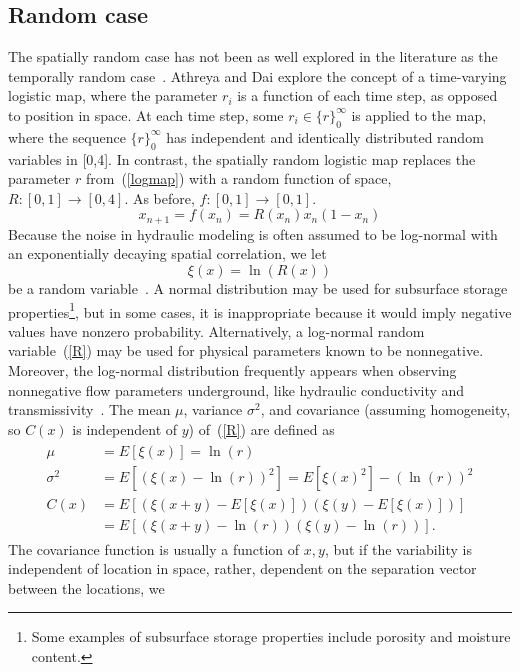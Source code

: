 \subsection{Random case}
The spatially random case has not been as well explored in the
literature as the temporally random case~\cite{athreya}. Athreya and
Dai explore the concept of a time-varying logistic map, where the
parameter $r_i$ is a function of each time step, as opposed to position
in space. At each time step, some $r_i \in \{r\}_0^\infty$ is applied
to the map, where the
sequence $\{r\}_0^\infty$ has independent and identically distributed
random variables in [0,4]. In contrast, the spatially random logistic map replaces the parameter $r$ from~(\ref{logmap}) with a random function of space, $R:[0,1]\to [0,4]$. As before,
$f:[0,1]\to [0,1]$.
\begin{equation}\label{randlogmap}
x_{n+1} = f(x_n) = R(x_n)x_n(1-x_n)
\end{equation}
Because the noise in hydraulic modeling is often assumed to be log-normal with an
exponentially decaying spatial correlation, we let
\begin{equation}\label{R}
\xi(x)=\ln(R(x)) 
\end{equation}
be a random variable~\cite{gelhar}. A normal distribution may be used
for subsurface storage properties\footnote{Some examples of subsurface
storage properties include porosity and moisture content.}, but in some cases, it is
inappropriate because it would imply negative values have nonzero
probability. Alternatively, a log-normal random variable~(\ref{R}) may
be used for physical parameters known to be nonnegative. Moreover, the log-normal distribution frequently appears when observing
nonnegative flow parameters underground, like hydraulic conductivity and
transmissivity~\cite{gelhar}. The mean $\mu$, variance $\sigma^2$, and
covariance (assuming homogeneity, so $C(x)$ is independent of $y$)
of~(\ref{R}) are defined as
\begin{align}
\begin{split}\label{cor}
\mu&=E[\xi(x)] = \ln(r)\\
\sigma^2&=E[(\xi(x) - \ln(r))^2]=E[\xi(x)^2]-(\ln(r))^2\\
C(x) &=E[(\xi(x+y) - E[\xi(x)])(\xi(y)-E[\xi(x)])] \\
&= E[(\xi(x+y) -\ln(r))(\xi(y)-\ln(r))]. 
\end{split}
\end{align}
The covariance function is usually a function of $x,y$, but if the
variability is independent of location in space, rather, dependent on the separation vector between the locations, we

